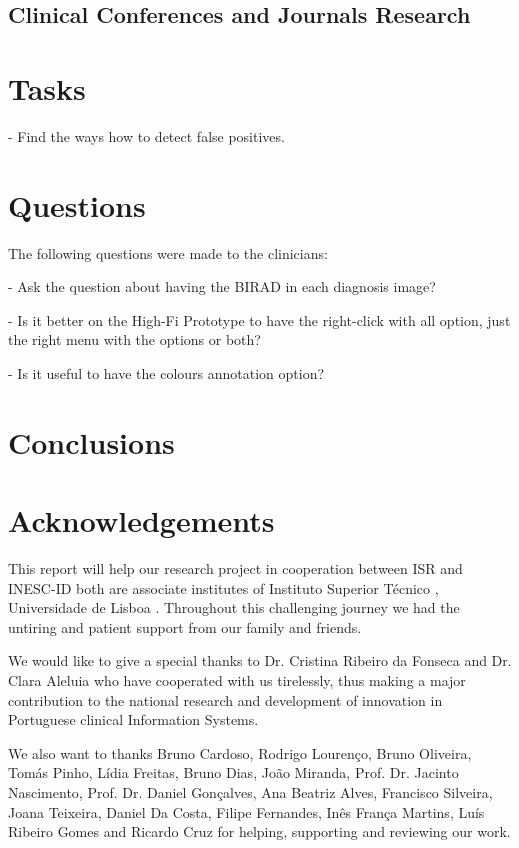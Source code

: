 \subsection{Clinical Conferences and Journals Research}

\section{Tasks}

- Find the ways how to detect false positives.

\section{Questions}

The following questions were made to the clinicians:

- Ask the question about having the BIRAD in each diagnosis image?

- Is it better on the High-Fi Prototype to have the right-click with all option, just the right menu with the options or both?

- Is it useful to have the colours annotation option?

\clearpage

\section{Conclusions}

\clearpage

\section{Acknowledgements}

This report will help our research project in cooperation between ISR \cite{isr} and INESC-ID \cite{inescid} both are associate institutes of Instituto Superior T\'{e}cnico \cite{ist}, Universidade de Lisboa \cite{ul}. Throughout this challenging journey we had the untiring and patient support from our family and friends.

We would like to give a special thanks to Dr. Cristina Ribeiro da Fonseca and Dr. Clara Aleluia who have cooperated with us tirelessly, thus making a major contribution to the national research and development of innovation in Portuguese clinical Information Systems.

We also want to thanks Bruno Cardoso, Rodrigo Louren\c{c}o, Bruno Oliveira, Tom\'{a}s Pinho, L\'{i}dia Freitas, Bruno Dias, Jo\~{a}o Miranda, Prof. Dr. Jacinto Nascimento, Prof. Dr. Daniel Gon\c{c}alves, Ana Beatriz Alves, Francisco Silveira, Joana Teixeira, Daniel Da Costa, Filipe Fernandes, In\^{e}s Fran\c{c}a Martins, Lu\'{i}s Ribeiro Gomes and Ricardo Cruz for helping, supporting and reviewing our work.

\clearpage

\printbibliography


